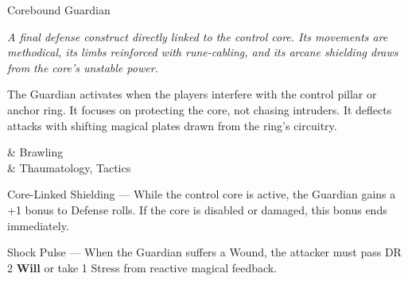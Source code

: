 \begin{NPC}[%
    name=Corebound Guardian,%
    description=Crystal-Wired Control Warden%
  ]{Corebound Guardian}
  
    \emph{A final defense construct directly linked to the control core. Its movements are methodical, its limbs reinforced with rune-cabling, and its arcane shielding draws from the core’s unstable power.}
  
    The Guardian activates when the players interfere with the control pillar or anchor ring. It focuses on protecting the core, not chasing intruders. It deflects attacks with shifting magical plates drawn from the ring’s circuitry.

    \vspace*{0.5\baselineskip}
    \begin{SkillsBox}
        \Expert & Brawling \\
        \Skilled & Thaumatology, Tactics \\
    \end{SkillsBox}

    \begin{TraitsBox}
      \item[Core-Linked Shielding] — While the control core is active, the Guardian gains a +1 bonus to Defense rolls. If the core is disabled or damaged, this bonus ends immediately.
      \item[Shock Pulse] — When the Guardian suffers a Wound, the attacker must pass DR 2 \textbf{Will} or take 1 Stress from reactive magical feedback.
    \end{TraitsBox}
  
    \DamageBox[totalfatigue=3,totalmild=3,totalmoderate=2,totalsevere=2]%

\end{NPC}

